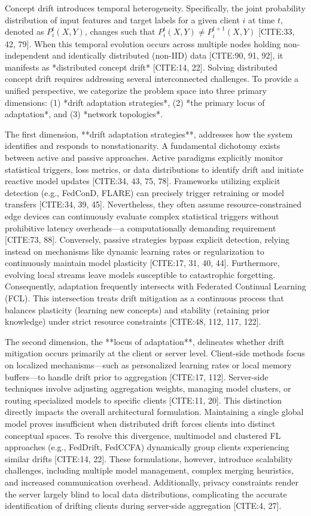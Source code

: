 \documentclass[journal]{IEEEtran}
\begin{document}
Concept drift introduces temporal heterogeneity. Specifically, the joint probability distribution of input features and target labels for a given client $i$ at time $t$, denoted as $P_i^t(X, Y)$, changes such that $P_i^t(X, Y) \neq P_i^{t+1}(X, Y)$ [CITE:33, 42, 79]. When this temporal evolution occurs across multiple nodes holding non-independent and identically distributed (non-IID) data [CITE:90, 91, 92], it manifests as *distributed concept drift* [CITE:14, 22]. Solving distributed concept drift requires addressing several interconnected challenges. To provide a unified perspective, we categorize the problem space into three primary dimensions: (1) *drift adaptation strategies*, (2) *the primary locus of adaptation*, and (3) *network topologies*.

The first dimension, **drift adaptation strategies**, addresses how the system identifies and responds to nonstationarity. A fundamental dichotomy exists between active and passive approaches. Active paradigms explicitly monitor statistical triggers, loss metrics, or data distributions to identify drift and initiate reactive model updates [CITE:34, 43, 75, 78]. Frameworks utilizing explicit detection (e.g., FedConD, FLARE) can precisely trigger retraining or model transfers [CITE:34, 39, 45]. Nevertheless, they often assume resource-constrained edge devices can continuously evaluate complex statistical triggers without prohibitive latency overheads—a computationally demanding requirement [CITE:73, 88]. Conversely, passive strategies bypass explicit detection, relying instead on mechanisms like dynamic learning rates or regularization to continuously maintain model plasticity [CITE:17, 31, 40, 44]. Furthermore, evolving local streams leave models susceptible to catastrophic forgetting. Consequently, adaptation frequently intersects with Federated Continual Learning (FCL). This intersection treats drift mitigation as a continuous process that balances plasticity (learning new concepts) and stability (retaining prior knowledge) under strict resource constraints [CITE:48, 112, 117, 122].

The second dimension, the **locus of adaptation**, delineates whether drift mitigation occurs primarily at the client or server level. Client-side methods focus on localized mechanisms—such as personalized learning rates or local memory buffers—to handle drift prior to aggregation [CITE:17, 112]. Server-side techniques involve adjusting aggregation weights, managing model clusters, or routing specialized models to specific clients [CITE:11, 20]. This distinction directly impacts the overall architectural formulation. Maintaining a single global model proves insufficient when distributed drift forces clients into distinct conceptual spaces. To resolve this divergence, multimodel and clustered FL approaches (e.g., FedDrift, FedCCFA) dynamically group clients experiencing similar drifts [CITE:14, 22]. These formulations, however, introduce scalability challenges, including multiple model management, complex merging heuristics, and increased communication overhead. Additionally, privacy constraints render the server largely blind to local data distributions, complicating the accurate identification of drifting clients during server-side aggregation [CITE:4, 27].
\end{document}
